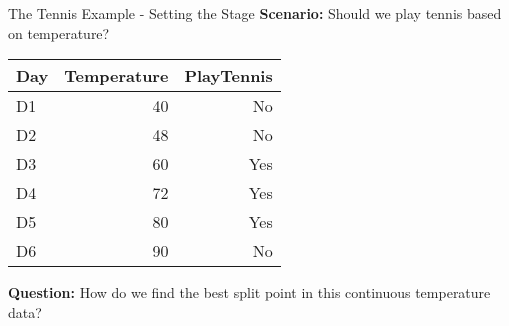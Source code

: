 \documentclass[usenames,dvipsnames]{beamer}
\begin{document}
\begin{frame}{The Tennis Example - Setting the Stage}
\textbf{Scenario:} Should we play tennis based on temperature?
\begin{table}[]
	\begin{tabular}{@{}lrr@{}}
		\toprule
		\textbf{Day} & \textbf{Temperature} & \textbf{PlayTennis} \\ \midrule
		D1           & 40                   & No                  \\
		D2           & 48                   & No                  \\
		D3           & 60                   & Yes                 \\
		D4           & 72                   & Yes                 \\
		D5           & 80                   & Yes                 \\
		D6           & 90                   & No                  \\ \bottomrule
	\end{tabular}
\end{table}

\textbf{Question:} How do we find the best split point in this continuous temperature data?
\end{frame}
\end{document}
